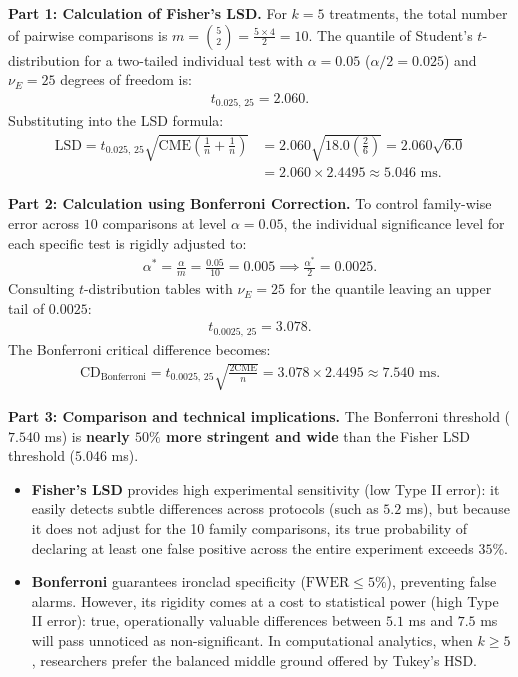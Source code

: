 \begin{solproblema}
	\textbf{Part 1: Calculation of Fisher's LSD.}
	For $k = 5$ treatments, the total number of pairwise comparisons is $m = \binom{5}{2} = \frac{5 \times 4}{2} = 10$.
	The quantile of Student's $t$-distribution for a two-tailed individual test with $\alpha = 0.05$ ($\alpha/2 = 0.025$) and $\nu_E = 25$ degrees of freedom is:
	\begin{align}
		t_{0.025, \, 25} = 2.060.
	\end{align}
	Substituting into the LSD formula:
	\begin{align}
		\text{LSD} = t_{0.025, \, 25} \sqrt{\text{CME} \left( \frac{1}{n} + \frac{1}{n} \right)} &= 2.060 \sqrt{18.0 \left( \frac{2}{6} \right)} = 2.060 \sqrt{6.0} \\
		&= 2.060 \times 2.4495 \approx 5.046 \text{ ms}.
	\end{align}
	
	\textbf{Part 2: Calculation using Bonferroni Correction.}
	To control family-wise error across $10$ comparisons at level $\alpha = 0.05$, the individual significance level for each specific test is rigidly adjusted to:
	\begin{align}
		\alpha^* = \frac{\alpha}{m} = \frac{0.05}{10} = 0.005 \implies \frac{\alpha^*}{2} = 0.0025.
	\end{align}
	Consulting $t$-distribution tables with $\nu_E = 25$ for the quantile leaving an upper tail of $0.0025$:
	\begin{align}
		t_{0.0025, \, 25} = 3.078.
	\end{align}
	The Bonferroni critical difference becomes:
	\begin{align}
		\text{CD}_{\text{Bonferroni}} = t_{0.0025, \, 25} \sqrt{\frac{2 \text{CME}}{n}} = 3.078 \times 2.4495 \approx 7.540 \text{ ms}.
	\end{align}
	
	\textbf{Part 3: Comparison and technical implications.}
	The Bonferroni threshold ($7.540$ ms) is \textbf{nearly $50\%$ more stringent and wide} than the Fisher LSD threshold ($5.046$ ms).
	\begin{itemize}
		\item \textbf{Fisher's LSD} provides high experimental sensitivity (low Type II error): it easily detects subtle differences across protocols (such as $5.2$ ms), but because it does not adjust for the 10 family comparisons, its true probability of declaring at least one false positive across the entire experiment exceeds $35\%$.
		\item \textbf{Bonferroni} guarantees ironclad specificity ($\text{FWER} \leq 5\%$), preventing false alarms. However, its rigidity comes at a cost to statistical power (high Type II error): true, operationally valuable differences between $5.1$ ms and $7.5$ ms will pass unnoticed as non-significant. In computational analytics, when $k \geq 5$, researchers prefer the balanced middle ground offered by Tukey's HSD.
	\end{itemize}
\end{solproblema}

